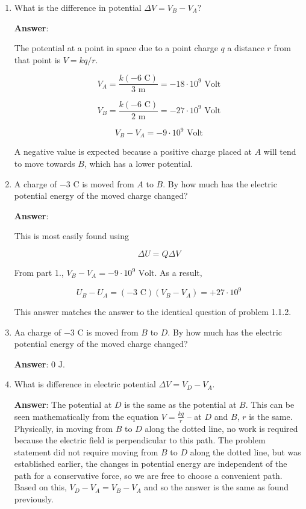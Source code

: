 \documentclass{article}
\begin{document}


\begin{enumerate}

  \item What is the difference in potential $\Delta V = V_B-V_A$?

        \ifsolutions
        {\bf Answer}:

        The potential at a point in space due to a point charge $q$ a distance $r$ from that point is $V={kq}/{r}$.

        $$V_A=\frac{k(-6\text{ C})}{3\text { m}}=-18\cdot 10^9\text{ Volt}$$

        $$V_B=\frac{k(-6\text{ C})}{2\text { m}}=-27\cdot 10^9\text{ Volt}$$

        $$V_B-V_A=-9\cdot 10^9\text{ Volt}$$

        A negative value is expected because a positive charge placed at $A$ will tend to move towards $B$, which has a lower potential.
        \else

        \vskip 48pt
        \fi

  \item A charge of $-3\text{ C}$ is moved from $A$ to $B$. By how much has the electric potential energy of the moved charge changed?

        \ifsolutions
        {\bf Answer}:

        This is most easily found using

        $$\Delta U = Q{\Delta V}$$

        From part 1., $V_B-V_A=-9\cdot 10^9\text{ Volt}$. As a result, 

        $$U_B-U_A= (-3\text{ C})(V_B-V_A)=+27\cdot 10^9$$

        This answer matches the answer to the identical question of problem 1.1.2.
        \else

        \vskip 48pt
        \fi

  \item Aa charge of $-3\text{ C}$ is moved from $B$ to $D$. By how much has the electric potential energy of the moved charge changed?

        \ifsolutions
        {\bf Answer}: $0\text{ J}$.
        \else

        \vskip 48pt
        \fi

  \item What is difference in electric potential $\Delta V = V_D-V_A$.

        \ifsolutions
        {\bf Answer}: The potential at $D$ is the same as the potential at $B$. This can be seen mathematically from the equation $V=\frac{kq}{r}$ -- at $D$ and $B$, $r$ is the same. Physically, in moving from $B$ to $D$ along the dotted line, no work is required because the electric field is perpendicular to this path. The problem statement did not require moving from $B$ to $D$ along the dotted line, but was established earlier, the changes in potential energy are independent of the path for a conservative force, so we are free to choose a convenient path. Based on this, $V_D-V_A=V_B-V_A$ and so the answer is the same as found previously.
        \else


\end{enumerate}
\end{document}
